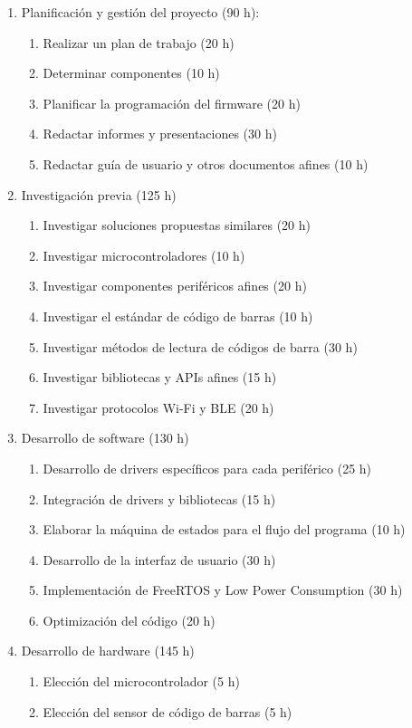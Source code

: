 \documentclass[
11pt, %
codirector, %
]{charter}
\begin{document}
\begin{enumerate}
\item Planificación y gestión del proyecto (90 h):
	\begin{enumerate}
	\item Realizar un plan de trabajo (20 h)
	\item Determinar componentes (10 h)
    \item Planificar la programación del firmware (20 h)
	\item Redactar informes y presentaciones (30 h)
    \item Redactar guía de usuario y otros documentos afines (10 h)
	\end{enumerate}
\item Investigación previa (125 h)
	\begin{enumerate}
	\item Investigar soluciones propuestas similares (20 h)
	\item Investigar microcontroladores (10 h)
	\item Investigar componentes periféricos afines (20 h)
    \item Investigar el estándar de código de barras (10 h)
    \item Investigar métodos de lectura de códigos de barra (30 h)
    \item Investigar bibliotecas y APIs afines (15 h)
    \item Investigar protocolos Wi-Fi y BLE (20 h)
	\end{enumerate}
\item Desarrollo de software (130 h)
	\begin{enumerate}
	\item Desarrollo de drivers específicos para cada periférico (25 h)
	\item Integración de drivers y bibliotecas (15 h)
	\item Elaborar la máquina de estados para el flujo del programa (10 h)
	\item Desarrollo de la interfaz de usuario (30 h)
    \item Implementación de FreeRTOS y Low Power Consumption (30 h)
    \item Optimización del código (20 h)
	\end{enumerate}
 \item Desarrollo de hardware (145 h)
	\begin{enumerate}
	\item Elección del microcontrolador (5 h)
	\item Elección del sensor de código de barras (5 h)

\end{enumerate}
\end{enumerate}
\end{document}
